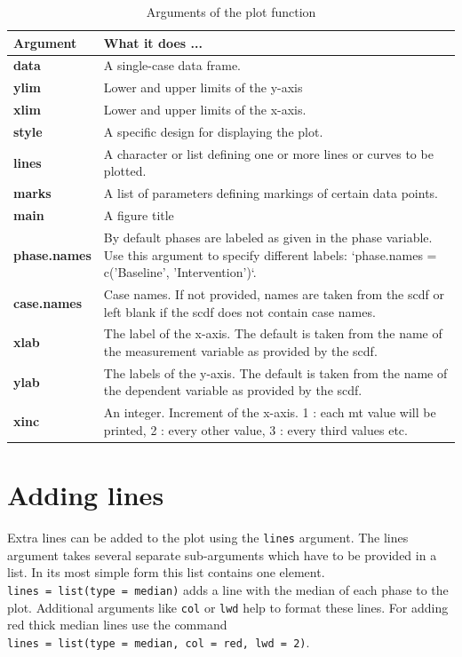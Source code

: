 \documentclass[
]{book}
\begin{document}
\begin{table}

\caption{\label{tab:table-plot-arguments}Arguments of the plot function}
\begin{tabular}[t]{>{\raggedright\arraybackslash}p{15em}>{\raggedright\arraybackslash}p{30em}}
\toprule
Argument & What it does ...\\
\midrule
\textbf{data} & A single-case data frame.\\
\textbf{ylim} & Lower and upper limits of the y-axis\\
\textbf{xlim} & Lower and upper limits of the x-axis.\\
\textbf{style} & A specific design for displaying the plot.\\
\textbf{lines} & A character or list defining one or more lines or curves to be plotted.\\
\textbf{marks} & A list of parameters defining markings of certain data points.\\
\textbf{main} & A figure title\\
\textbf{phase.names} & By default phases are labeled as given in the phase variable. Use this argument to specify different labels: `phase.names = c('Baseline', 'Intervention')`.\\
\textbf{case.names} & Case names. If not provided, names are taken from the scdf or left blank if the scdf does not contain case names.\\
\textbf{xlab} & The label of the x-axis. The default is taken from the name of the measurement variable as provided by the scdf.\\
\textbf{ylab} & The labels of the y-axis. The default is taken from the name of the dependent variable as provided by the scdf.\\
\textbf{xinc} & An integer. Increment of the x-axis. 1 : each mt value will be printed, 2 : every other value, 3 : every third values etc.\\
\bottomrule
\end{tabular}
\end{table}

\hypertarget{adding-lines}{%
\section{Adding lines}\label{adding-lines}}

Extra lines can be added to the plot using the \texttt{lines} argument. The lines argument takes several separate sub-arguments which have to be provided in a list. In its most simple form this list contains one element. \texttt{lines\ =\ list(type\ =\ \textquotesingle{}median\textquotesingle{})} adds a line with the median of each phase to the plot. Additional arguments like \texttt{col} or \texttt{lwd} help to format these lines. For adding red thick median lines use the command \texttt{lines\ =\ list(type\ =\ \textquotesingle{}median\textquotesingle{},\ col\ =\ \textquotesingle{}red\textquotesingle{},\ lwd\ =\ \textquotesingle{}2\textquotesingle{})}.
\end{document}
